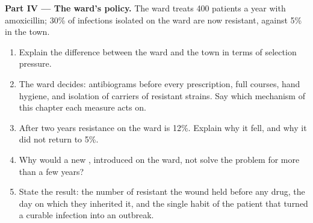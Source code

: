 \begin{problem}
\medskip
\noindent\textbf{Part IV --- The ward's policy.}
The ward treats 400 patients a year with amoxicillin; 30\% of
infections isolated on the ward are now resistant, against 5\% in the
town.
\begin{enumerate}[resume]
  \item Explain the difference between the ward and the town in terms
        of selection pressure.
  \item The ward decides: antibiograms before every prescription,
        full courses, hand hygiene, and isolation of carriers of
        resistant strains. Say which mechanism of this chapter each
        measure acts on.
  \item After two years resistance on the ward is 12\%. Explain why
        it fell, and why it did not return to 5\%.
  \item Why would a new , introduced on the ward, not solve
        the problem for more than a few years?
  \item State the result: the number of resistant  the wound
        held before any drug, the day on which they inherited it, and
        the single habit of the patient that turned a curable
        infection into an outbreak.
\end{enumerate}
\end{problem}
